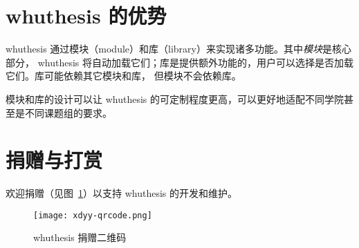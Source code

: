 \section{whuthesis 的优势}

whuthesis 通过模块（module）和库（library）来实现诸多功能。其中\emph{模块}是核心部分，
whuthesis 将自动加载它们；库是提供额外功能的，用户可以选择是否加载它们。库可能依赖其它模块和库，
但模块不会依赖库。


模块和库的设计可以让 whuthesis 的可定制程度更高，可以更好地适配不同学院甚至是不同课题组的要求。


\section{捐赠与打赏}

欢迎捐赠（见图~\ref{fig:donate}）以支持 whuthesis 的开发和维护。

\begin{figure}[htbp]
  \centering
  \texttt{[image: xdyy-qrcode.png]} 
  \caption{whuthesis 捐赠二维码}
  \label{fig:donate}
\end{figure}